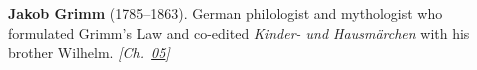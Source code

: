 \textbf{Jakob Grimm} (1785–1863). German philologist and mythologist who formulated Grimm's Law and co-edited \emph{Kinder- und Hausm\"{a}rchen} with his brother Wilhelm. \emph{[Ch.~\hyperref[ch:circlewheel]{05}]}

